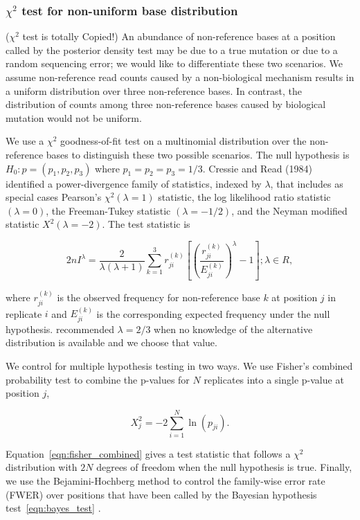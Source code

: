 \documentclass[11pt,reqno]{amsart}
\begin{document}
\subsubsection{$\chi^2$ test for non-uniform base distribution}
($\chi^2$ test is totally Copied!)
An abundance of non-reference bases at a position called by the posterior density test may be due to a true mutation or due to a random sequencing error;
we would like to differentiate these two scenarios. We assume non-reference read counts caused by a non-biological mechanism results in a uniform distribution over three non-reference bases.
In contrast, the distribution of counts among three non-reference bases caused by biological mutation would not be uniform.

We use a $\chi^2$ goodness-of-fit test on a multinomial distribution over the non-reference bases to distinguish these two possible scenarios.
The null hypothesis is $H_0: p = (p_1, p_2, p_3)$ where $p_1=p_2=p_3=1/3$.
Cressie and Read (1984) identified a power-divergence family of statistics, indexed by $\lambda$,
that includes as special cases Pearson's $\chi^2 (\lambda = 1)$ statistic, the log likelihood ratio statistic $(\lambda = 0)$, the Freeman-Tukey statistic $(\lambda = -1/2)$, and the Neyman modified statistic $X^2 (\lambda = -2)$.
The test statistic is

\begin{equation}
 2nI^\lambda = \frac{2}{\lambda(\lambda+1)}\sum_{k=1}^3 r_{ji}^{(k)} \left[\left(\frac{r_{ji}^{(k)}}{E_{ji}^{(k)}}\right)^\lambda-1\right];\lambda \in R,
\end{equation}

where $r_{ji}^{(k)}$ is the observed frequency for non-reference base $k$ at position $j$ in replicate $i$ and $E_{ji}^{(k)}$ is the corresponding expected frequency under the null hypothesis.
 \citet{cressie1984multinomial} recommended $\lambda = 2/3$ when no knowledge of the alternative distribution is available and we choose that value.

We control for multiple hypothesis testing in two ways. We use Fisher's combined probability test \citep{fisher1970statistical} to combine the p-values for $N$ replicates into a single p-value at position $j$,

\begin{equation}\label{eqn:fisher_combined}
	X_j^2 = -2 \sum_{i=1}^N \ln(p_{ji}).
\end{equation}

Equation~\eqref{eqn:fisher_combined} gives a test statistic that follows a $\chi^2$ distribution with $2N$ degrees of freedom when the null hypothesis is true.
Finally, we use the Bejamini-Hochberg method to control the family-wise error rate (FWER) over positions that have been called by the Bayesian hypothesis test~\eqref{eqn:bayes_test} \citep{benjamini1995controlling, efron2010large}.
\end{document}
